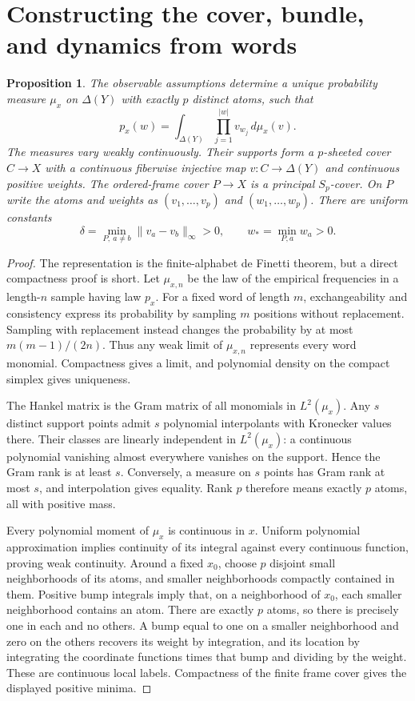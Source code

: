 \documentclass[11pt]{article}
\newtheorem{proposition}[theorem]{Proposition}
\theoremstyle{remark}\newtheorem{remark}[theorem]{Remark}
\begin{document}
\section{Constructing the cover, bundle, and dynamics from words}
\begin{proposition}\label{prop:observable}
The observable assumptions determine a unique probability measure $\mu_x$ on $\Delta(Y)$ with exactly $p$ distinct atoms, such that
\[
 p_x(w)=\int_{\Delta(Y)}\prod_{j=1}^{|w|}v_{w_j}\,d\mu_x(v).
\]
The measures vary weakly continuously. Their supports form a $p$-sheeted cover $C\to X$ with a continuous fiberwise injective map $v:C\to\Delta(Y)$ and continuous positive weights. The ordered-frame cover $P\to X$ is a principal $S_p$-cover. On $P$ write the atoms and weights as $(v_1,\ldots,v_p)$ and $(w_1,\ldots,w_p)$. There are uniform constants
\[
 \delta=\min_{P,\ a\ne b}\|v_a-v_b\|_\infty>0,
 \qquad w_* =\min_{P,a}w_a>0.
\]
\end{proposition}
\begin{proof}
The representation is the finite-alphabet de Finetti theorem, but a direct compactness proof is short. Let $\mu_{x,n}$ be the law of the empirical frequencies in a length-$n$ sample having law $p_x$. For a fixed word of length $m$, exchangeability and consistency express its probability by sampling $m$ positions without replacement. Sampling with replacement instead changes the probability by at most $m(m-1)/(2n)$. Thus any weak limit of $\mu_{x,n}$ represents every word monomial. Compactness gives a limit, and polynomial density on the compact simplex gives uniqueness.

The Hankel matrix is the Gram matrix of all monomials in $L^2(\mu_x)$. Any $s$ distinct support points admit $s$ polynomial interpolants with Kronecker values there. Their classes are linearly independent in $L^2(\mu_x)$: a continuous polynomial vanishing almost everywhere vanishes on the support. Hence the Gram rank is at least $s$. Conversely, a measure on $s$ points has Gram rank at most $s$, and interpolation gives equality. Rank $p$ therefore means exactly $p$ atoms, all with positive mass.

Every polynomial moment of $\mu_x$ is continuous in $x$. Uniform polynomial approximation implies continuity of its integral against every continuous function, proving weak continuity. Around a fixed $x_0$, choose $p$ disjoint small neighborhoods of its atoms, and smaller neighborhoods compactly contained in them. Positive bump integrals imply that, on a neighborhood of $x_0$, each smaller neighborhood contains an atom. There are exactly $p$ atoms, so there is precisely one in each and no others. A bump equal to one on a smaller neighborhood and zero on the others recovers its weight by integration, and its location by integrating the coordinate functions times that bump and dividing by the weight. These are continuous local labels. Compactness of the finite frame cover gives the displayed positive minima.
\end{proof}
\end{document}
